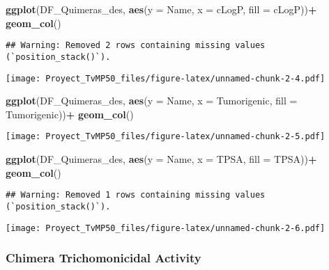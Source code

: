 \documentclass[
]{article}
\newenvironment{Shaded}{\begin{snugshade}}{\end{snugshade}}
\newcommand{\AttributeTok}[1]{\textcolor[rgb]{0.13,0.29,0.53}{#1}}
\newcommand{\FunctionTok}[1]{\textcolor[rgb]{0.13,0.29,0.53}{\textbf{#1}}}
\newcommand{\NormalTok}[1]{#1}
\newcommand{\SpecialCharTok}[1]{\textcolor[rgb]{0.81,0.36,0.00}{\textbf{#1}}}
\begin{document}
\begin{Shaded}
\begin{Highlighting}[]
\FunctionTok{ggplot}\NormalTok{(DF\_Quimeras\_des, }\FunctionTok{aes}\NormalTok{(}\AttributeTok{y =}\NormalTok{ Name, }\AttributeTok{x =}\NormalTok{ cLogP, }\AttributeTok{fill =}\NormalTok{  cLogP))}\SpecialCharTok{+}
  \FunctionTok{geom\_col}\NormalTok{()}
\end{Highlighting}
\end{Shaded}

\begin{verbatim}
## Warning: Removed 2 rows containing missing values (`position_stack()`).
\end{verbatim}

\texttt{[image: Proyect\_TvMP50\_files/figure-latex/unnamed-chunk-2-4.pdf]}

\begin{Shaded}
\begin{Highlighting}[]
\FunctionTok{ggplot}\NormalTok{(DF\_Quimeras\_des, }\FunctionTok{aes}\NormalTok{(}\AttributeTok{y =}\NormalTok{ Name, }\AttributeTok{x =}\NormalTok{ Tumorigenic, }\AttributeTok{fill =}\NormalTok{  Tumorigenic))}\SpecialCharTok{+}
  \FunctionTok{geom\_col}\NormalTok{()}
\end{Highlighting}
\end{Shaded}

\texttt{[image: Proyect\_TvMP50\_files/figure-latex/unnamed-chunk-2-5.pdf]}

\begin{Shaded}
\begin{Highlighting}[]
\FunctionTok{ggplot}\NormalTok{(DF\_Quimeras\_des, }\FunctionTok{aes}\NormalTok{(}\AttributeTok{y =}\NormalTok{ Name, }\AttributeTok{x =}\NormalTok{ TPSA, }\AttributeTok{fill =}\NormalTok{  TPSA))}\SpecialCharTok{+}
  \FunctionTok{geom\_col}\NormalTok{()}
\end{Highlighting}
\end{Shaded}

\begin{verbatim}
## Warning: Removed 1 rows containing missing values (`position_stack()`).
\end{verbatim}

\texttt{[image: Proyect\_TvMP50\_files/figure-latex/unnamed-chunk-2-6.pdf]}

\hypertarget{chimera-trichomonicidal-activity}{%
\subsubsection{Chimera Trichomonicidal
Activity}\label{chimera-trichomonicidal-activity}}
\end{document}
